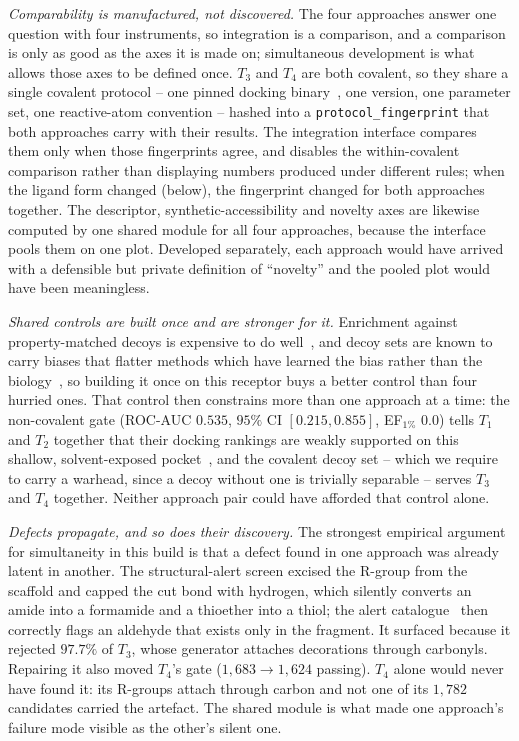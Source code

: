 \emph{Comparability is manufactured, not discovered.}
The four approaches answer one question with four instruments, so
integration is a comparison, and a comparison is only as good as the
axes it is made on; simultaneous development is what allows those axes
to be defined once.
$T_3$ and $T_4$ are both covalent, so they share a single covalent
protocol -- one pinned docking binary~\cite{mcnutt_gnina_2021}, one
version, one parameter set, one reactive-atom convention -- hashed into
a \texttt{protocol\_fingerprint} that both approaches carry with their
results.
The integration interface compares them only when those fingerprints
agree, and disables the within-covalent comparison rather than
displaying numbers produced under different rules; when the ligand form
changed (below), the fingerprint changed for both approaches together.
The descriptor, synthetic-accessibility and novelty axes are likewise
computed by one shared module for all four approaches, because the
interface pools them on one plot.
Developed separately, each approach would have arrived with a
defensible but private definition of ``novelty'' and the pooled plot
would have been meaningless.

\emph{Shared controls are built once and are stronger for it.}
Enrichment against property-matched decoys is expensive to do
well~\cite{mysinger_directory_2012,truchon_evaluating_2007}, and decoy
sets are known to carry biases that flatter methods which have learned
the bias rather than the
biology~\cite{chen_hidden_2019,sieg_need_2019,wallach_most_2018}, so
building it once on this receptor buys a better control than four
hurried ones.
That control then constrains more than one approach at a time: the
non-covalent gate (ROC-AUC $0.535$, $95\%$ CI $[0.215, 0.855]$,
EF$_{1\%}$ $0.0$) tells $T_1$ and $T_2$ together that their docking
rankings are weakly supported on this shallow, solvent-exposed
pocket~\cite{trott_autodock_2010,warren_critical_2006}, and the covalent
decoy set -- which we require to carry a warhead, since a decoy without
one is trivially separable -- serves $T_3$ and $T_4$ together.
Neither approach pair could have afforded that control alone.

\emph{Defects propagate, and so does their discovery.}
The strongest empirical argument for simultaneity in this build is that
a defect found in one approach was already latent in another.
The structural-alert screen excised the R-group from the scaffold and
capped the cut bond with hydrogen, which silently converts an amide into
a formamide and a thioether into a thiol; the alert
catalogue~\cite{brenk_lessons_2008} then correctly flags an aldehyde
that exists only in the fragment.
It surfaced because it rejected $97.7\%$ of $T_3$, whose generator
attaches decorations through carbonyls.
Repairing it also moved $T_4$'s gate ($1{,}683 \to 1{,}624$ passing).
$T_4$ alone would never have found it: its R-groups attach through
carbon and not one of its $1{,}782$ candidates carried the artefact.
The shared module is what made one approach's failure mode visible as
the other's silent one.

